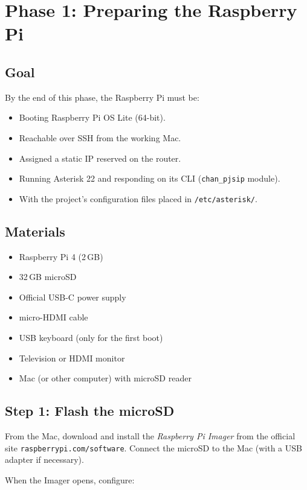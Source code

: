 \chapter{Phase 1: Preparing the Raspberry Pi}

\section{Goal}

By the end of this phase, the Raspberry Pi must be:

\begin{itemize}
  \item Booting Raspberry Pi OS Lite (64-bit).
  \item Reachable over SSH from the working Mac.
  \item Assigned a static IP reserved on the router.
  \item Running Asterisk 22 and responding on its CLI (\texttt{chan\_pjsip} module).
  \item With the project's configuration files placed in \texttt{/etc/asterisk/}.
\end{itemize}

\section{Materials}

\begin{itemize}
  \item Raspberry Pi 4 (2\,GB)
  \item 32\,GB microSD
  \item Official USB-C power supply
  \item micro-HDMI cable
  \item USB keyboard (only for the first boot)
  \item Television or HDMI monitor
  \item Mac (or other computer) with microSD reader
\end{itemize}

\section{Step 1: Flash the microSD}

From the Mac, download and install the \emph{Raspberry Pi Imager} from the official site \texttt{raspberrypi.com/software}. Connect the microSD to the Mac (with a USB adapter if necessary).

When the Imager opens, configure:

